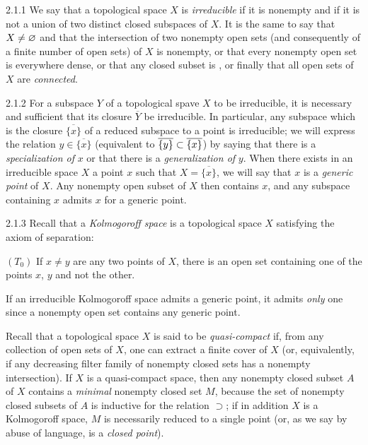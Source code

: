 \documentclass[../main.tex]{subfiles}
\begin{document}
\begin{cx}{2.1.1}
We say that a topological space $X$ is \emph{irreducible} if it is nonempty and
if it is not a union of two distinct closed subspaces of $X$. It is the same to say
that $X\neq\varnothing$ and that the intersection of two nonempty open sets (and consequently
of a finite number of open sets) of $X$ is nonempty, or that every nonempty open set
is everywhere dense, or that any closed subset is , or finally
that all open sets of $X$ are \emph{connected}.
\end{cx}

\begin{cx}{2.1.2}
For a subspace $Y$ of a topological spave $X$ to be irreducible, it is necessary and
sufficient that its closure $\overline{Y}$ be irreducible. In particular, any subspace
which is the closure $\overline{\{x\}}$ of a reduced subspace to a point is irreducible;
we will express the relation $y\in\overline{\{x\}}$ (equivalent to
$\overline{\{y\}}\subset\overline{\{x\}}$) by saying that there is a \emph{specialization of}
$x$ or that there is a \emph{generalization of} $y$. When there exists in an irreducible
space $X$ a point $x$ such that $X=\overline{\{x\}}$, we will say that $x$ is a
\emph{generic point} of $X$. Any nonempty open subset of $X$ then contains $x$, and any
subspace containing $x$ admits $x$ for a generic point.
\end{cx}

\begin{cx}{2.1.3}
Recall that a \emph{Kolmogoroff space} is a topological space $X$ satisfying the axiom
of separation:

$(T_0)$ If $x\neq y$ are any two points of $X$, there is an open set containing one of
the points $x$, $y$ and not the other.

If an irreducible Kolmogoroff space admits a generic point, it admits \emph{only} one
since a nonempty open set contains any generic point.

Recall that a topological space $X$ is said to be \emph{quasi-compact} if, from any
collection of open sets of $X$, one can extract a finite cover of $X$ (or, equivalently,
if any decreasing filter family of nonempty closed sets has a nonempty intersection). If
$X$ is a quasi-compact space, then any nonempty closed subset $A$ of $X$ contains a \emph{minimal}
nonempty closed set $M$, because the set of nonempty closed subsets of $A$ is inductive for
the relation $\supset$; if in addition $X$ is a Kolmogoroff space, $M$ is necessarily reduced
to a single point (or, as we say by abuse of language, is a \emph{closed point}).
\end{cx}
\end{document}
